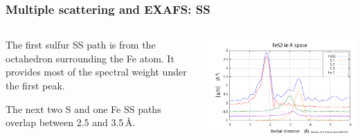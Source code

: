 \documentclass[10pt, xcolor=x11names, compress]{beamer}
\begin{document}
\begin{frame}
  \frametitle{Multiple scattering and EXAFS: SS}
  \begin{columns}
    \begin{column}{0.5\linewidth}
      The first sulfur SS path is from the octahedron surrounding the
      Fe atom.  It provides most of the spectral weight under the
      first peak.

      \medskip

      The next two S and one Fe SS paths overlap between 2.5 and
      3.5\,\AA.
    \end{column}
    \begin{column}{0.5\linewidth}
      \includegraphics[width=\linewidth]{images/fes2_ss.png}
    \end{column}
  \end{columns}
\end{frame}
\end{document}
